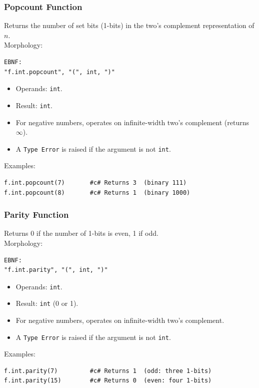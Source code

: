 \subsubsection{Popcount Function}
Returns the number of set bits (1-bits) in the two's complement representation of $n$. \\
Morphology:
\begin{verbatim}
EBNF:
"f.int.popcount", "(", int, ")"
\end{verbatim}
\begin{itemize}
\item Operands: \texttt{int}.
\item Result: \texttt{int}.
\item For negative numbers, operates on infinite-width two's complement (returns $\infty$).
\item A \texttt{Type Error} is raised if the argument is not \texttt{int}.
\end{itemize}
Examples:
\begin{verbatim}
f.int.popcount(7)       #c# Returns 3  (binary 111)
f.int.popcount(8)       #c# Returns 1  (binary 1000)
\end{verbatim}

\subsubsection{Parity Function}
Returns 0 if the number of 1-bits is even, 1 if odd. \\
Morphology:
\begin{verbatim}
EBNF:
"f.int.parity", "(", int, ")"
\end{verbatim}
\begin{itemize}
\item Operands: \texttt{int}.
\item Result: \texttt{int} (0 or 1).
\item For negative numbers, operates on infinite-width two's complement.
\item A \texttt{Type Error} is raised if the argument is not \texttt{int}.
\end{itemize}
Examples:
\begin{verbatim}
f.int.parity(7)         #c# Returns 1  (odd: three 1-bits)
f.int.parity(15)        #c# Returns 0  (even: four 1-bits)
\end{verbatim}

